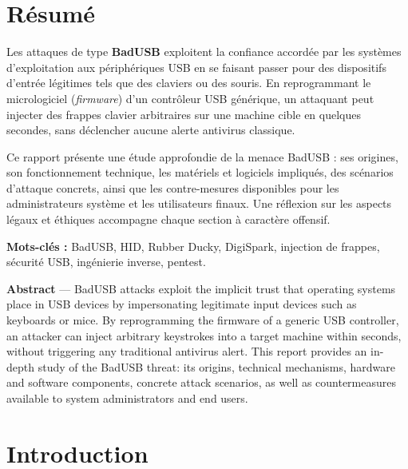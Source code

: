 \documentclass[12pt,a4paper]{report}
\begin{document}
\chapter*{Résumé}

Les attaques de type \textbf{BadUSB} exploitent la confiance accordée par les systèmes d'exploitation aux périphériques USB en se faisant passer pour des dispositifs d'entrée légitimes tels que des claviers ou des souris. En reprogrammant le micrologiciel (\textit{firmware}) d'un contrôleur USB générique, un attaquant peut injecter des frappes clavier arbitraires sur une machine cible en quelques secondes, sans déclencher aucune alerte antivirus classique.

Ce rapport présente une étude approfondie de la menace BadUSB : ses origines, son fonctionnement technique, les matériels et logiciels impliqués, des scénarios d'attaque concrets, ainsi que les contre-mesures disponibles pour les administrateurs système et les utilisateurs finaux. Une réflexion sur les aspects légaux et éthiques accompagne chaque section à caractère offensif.

\textbf{Mots-clés :} BadUSB, HID, Rubber Ducky, DigiSpark, injection de frappes, sécurité USB, ingénierie inverse, pentest.

\vspace{1em}
\noindent\textbf{Abstract} ---
BadUSB attacks exploit the implicit trust that operating systems place in USB devices by impersonating legitimate input devices such as keyboards or mice. By reprogramming the firmware of a generic USB controller, an attacker can inject arbitrary keystrokes into a target machine within seconds, without triggering any traditional antivirus alert. This report provides an in-depth study of the BadUSB threat: its origins, technical mechanisms, hardware and software components, concrete attack scenarios, as well as countermeasures available to system administrators and end users.

\tableofcontents
\listoffigures
\listoftables

\chapter{Introduction}
\end{document}
